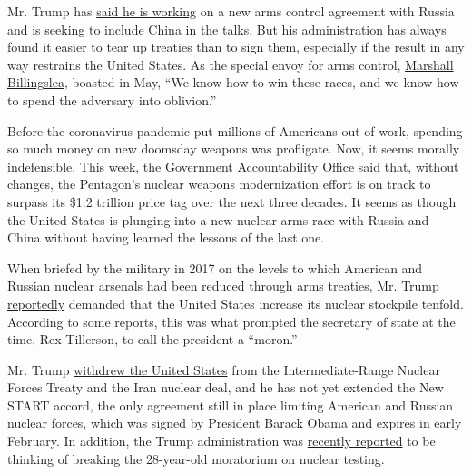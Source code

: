 Mr. Trump has
\href{https://foreignpolicy.com/2020/07/23/trump-china-russia-new-arms-control-agreement-start/}{said
he is working} on a new arms control agreement with Russia and is
seeking to include China in the talks. But his administration has always
found it easier to tear up treaties than to sign them, especially if the
result in any way restrains the United States. As the special envoy for
arms control,
\href{https://www.reuters.com/article/uk-usa-armscontrol/u-s-prepared-to-spend-russia-china-into-oblivion-to-win-nuclear-arms-race-u-s-envoy-idUSKBN22X2LS}{Marshall
Billingslea}, boasted in May, ``We know how to win these races, and we
know how to spend the adversary into oblivion.''

Before the coronavirus pandemic put millions of Americans out of work,
spending so much money on new doomsday weapons was profligate. Now, it
seems morally indefensible. This week, the
\href{https://homelandprepnews.com/stories/53270-report-examines-nuclear-weapons-modernization-costs/}{Government
Accountability Office} said that, without changes, the Pentagon's
nuclear weapons modernization effort is on track to surpass its \$1.2
trillion price tag over the next three decades. It seems as though the
United States is plunging into a new nuclear arms race with Russia and
China without having learned the lessons of the last one.

When briefed by the military in 2017 on the levels to which American and
Russian nuclear arsenals had been reduced through arms treaties, Mr.
Trump
\href{https://www.cnbc.com/2017/10/11/trump-reportedly-wanted-nearly-10-times-more-nuclear-weapons.html}{reportedly}
demanded that the United States increase its nuclear stockpile tenfold.
According to some reports, this was what prompted the secretary of state
at the time, Rex Tillerson, to call the president a ``moron.''

Mr. Trump
\href{https://www.nytimes3xbfgragh.onion/2019/02/01/us/politics/trump-inf-nuclear-treaty.html}{withdrew
the United States} from the Intermediate-Range Nuclear Forces Treaty and
the Iran nuclear deal, and he has not yet extended the New START accord,
the only agreement still in place limiting American and Russian nuclear
forces, which was signed by President Barack Obama and expires in early
February. In addition, the Trump administration was
\href{https://www.cnn.com/2020/06/24/politics/trump-administration-nuclear-test/index.html}{recently
reported} to be thinking of breaking the 28-year-old moratorium on
nuclear testing.

